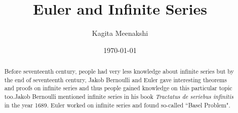 \documentclass[a4paper,reqno,11pt]{amsart}
\theoremstyle{plain}%
\begin{document}
	

	\title{\textbf{Euler and Infinite Series}}
	
	\author[Kagita Meenakshi]{Kagita Meenakshi}
	
	
	
	\address{Department of Mathematics, Indian Institute of Technology Hyderabad, Kandi, Sangareddy - 502285}
	
	
	\date{\today}
	
	
	
	\begin{abstract}
	 Before seventeenth century, people had very less knowledge about infinite series but by the end of seventeenth century, Jakob Bernoulli and Euler gave interesting theorems and proofs on infinite series and thus people gained knowledge on this particular topic too.Jakob Bernoulli mentioned infinite series in his book \textit{Tractatus de seriebus infinitis} in the year 1689.
Euler worked on infinite series and found so-called ``Basel Problem".\\
	\end{abstract}
	
	\maketitle
\end{document}
